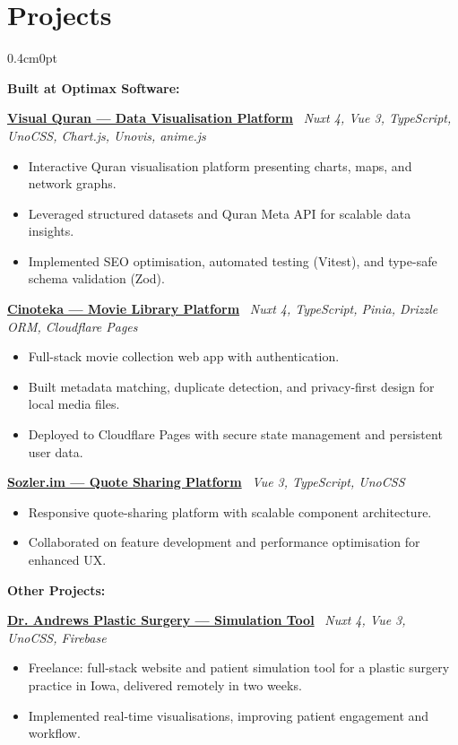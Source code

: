 \documentclass[a4paper,10pt]{article}
\newcommand{\Project}[3]{%
    \noindent \href{#2}{\textbf{#1}} \textbar~\textit{#3}%
    \vspace{0.2em}%
}
\newcommand{\Subtitle}[2][true]{%
    \vspace{0.3em}%
    {\fontsize{10.5}{12}\selectfont \textbf{#2}}%
    \ifstrequal{#1}{true}{\vspace{0.3em}}{}%
}
\begin{document}
\section*{Projects}
\begin{adjustwidth}{0.4cm}{0pt}

\Subtitle{Built at Optimax Software:}

\Project{Visual Quran — Data Visualisation Platform}{https://visual.koran.center}{Nuxt 4, Vue 3, TypeScript, UnoCSS, Chart.js, Unovis, anime.js}
\begin{itemize}
    \item Interactive Quran visualisation platform presenting charts, maps, and network graphs.
    \item Leveraged structured datasets and Quran Meta API for scalable data insights.
    \item Implemented SEO optimisation, automated testing (Vitest), and type-safe schema validation (Zod).
\end{itemize}

\Project{Cinoteka — Movie Library Platform}{https://cinoteka.com}{Nuxt 4, TypeScript, Pinia, Drizzle ORM, Cloudflare Pages}
\begin{itemize}
    \item Full-stack movie collection web app with authentication.
    \item Built metadata matching, duplicate detection, and privacy-first design for local media files.
    \item Deployed to Cloudflare Pages with secure state management and persistent user data.
\end{itemize}

\Project{Sozler.im — Quote Sharing Platform}{https://www.sozler.im}{Vue 3, TypeScript, UnoCSS}
\begin{itemize}
    \item Responsive quote-sharing platform with scalable component architecture.
    \item Collaborated on feature development and performance optimisation for enhanced UX.
\end{itemize}

\vspace{1em}
\Subtitle{Other Projects:}

\Project{Dr. Andrews Plastic Surgery — Simulation Tool}{https://github.com/aligu7/daps_simulation}{Nuxt 4, Vue 3, UnoCSS, Firebase}
\begin{itemize}
    \item Freelance: full-stack website and patient simulation tool for a plastic surgery practice in Iowa, delivered remotely in two weeks.
    \item Implemented real-time visualisations, improving patient engagement and workflow.
\end{itemize}


\end{adjustwidth}
\end{document}

